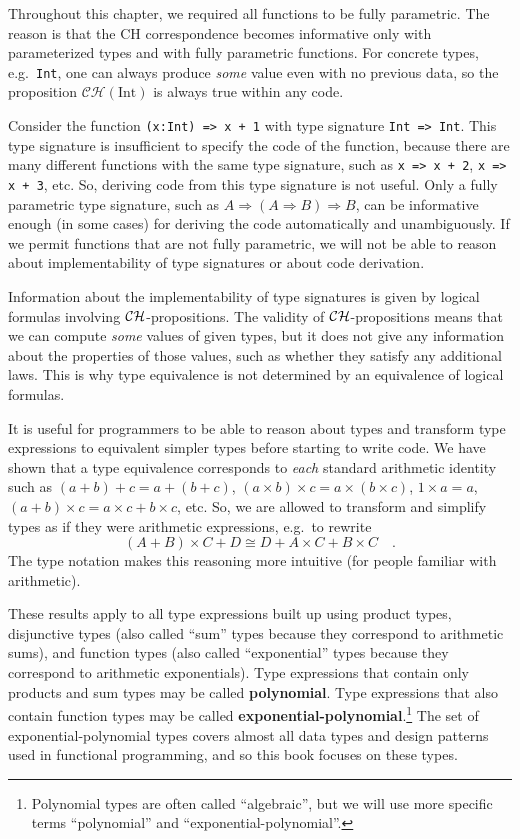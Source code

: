 Throughout this chapter, we required all functions to be fully parametric.
The reason is that the CH correspondence becomes informative only
with parameterized types and with fully parametric functions. For
concrete types, e.g.\ \lstinline!Int!, one can always produce \emph{some}
value even with no previous data, so the proposition $\mathcal{CH}(\text{Int})$
is always true within any code.

Consider the function \lstinline!(x:Int) => x + 1! with type signature
\lstinline!Int => Int!. This type signature is insufficient to specify
the code of the function, because there are many different functions
with the same type signature, such as \lstinline!x => x + 2!, \lstinline!x => x + 3!,
etc. So, deriving code from this type signature is not useful. Only
a fully parametric type signature, such as $A\Rightarrow\left(A\Rightarrow B\right)\Rightarrow B$,
can be informative enough (in some cases) for deriving the code automatically
and unambiguously. If we permit functions that are not fully parametric,
we will not be able to reason about implementability of type signatures
or about code derivation.

Information about the implementability of type signatures is given
by logical formulas involving ${\cal CH}$-propositions. The validity
of ${\cal CH}$-propositions means that we can compute \emph{some}
values of given types, but it does not give any information about
the properties of those values, such as whether they satisfy any additional
laws. This is why type equivalence is not determined by an equivalence
of logical formulas.

It is useful for programmers to be able to reason about types and
transform type expressions to equivalent simpler types before starting
to write code. We have shown that a type equivalence corresponds to
\emph{each} standard arithmetic identity such as $\left(a+b\right)+c=a+\left(b+c\right)$,
$\left(a\times b\right)\times c=a\times(b\times c)$, $1\times a=a$,
$\left(a+b\right)\times c=a\times c+b\times c$, etc. So, we are allowed
to transform and simplify types as if they were arithmetic expressions,
e.g.~to rewrite
\[
\left(A+B\right)\times C+D\cong D+A\times C+B\times C\quad.
\]
The type notation makes this reasoning more intuitive (for people
familiar with arithmetic). 

These results apply to all type expressions built up using product
types, disjunctive types (also called ``sum'' types because they
correspond to arithmetic sums), and function types (also called ``exponential''
types because they correspond to arithmetic exponentials). Type expressions
that contain only products and sum types may be called \textbf{polynomial}.
Type expressions that also contain function types may be called \textbf{exponential-polynomial}.\footnote{Polynomial types are often called ``algebraic'', but we will use
more specific terms ``polynomial'' and ``exponential-polynomial''.} The set of exponential-polynomial types covers almost all data types
and design patterns used in functional programming, and so this book
focuses on these types.

